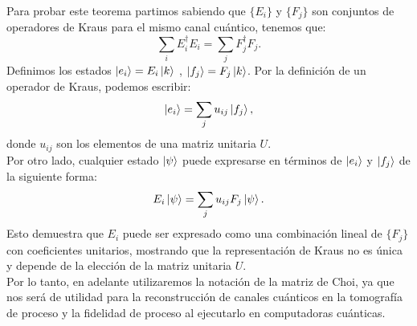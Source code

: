 \documentclass[letterpaper,12pt]{thesisECFM}
\theoremstyle{plain}
\theoremstyle{definition}
\theoremstyle{definition}
\theoremstyle{remark}
\newcommand{\1}{\mathbb{1}}
\begin{document}
Para probar este teorema partimos sabiendo que  $\{E_i\}$ y $\{F_j\}$ son conjuntos de operadores de Kraus para el mismo canal cuántico, tenemos que:
\begin{equation}
   \sum_i E_i^\dagger E_i = \sum_j F_j^\dagger F_j. 
\end{equation}
Definimos los estados $\ket{e_i} = E_i \ket{k}$ , $\ket{f_j} = F_j \ket{k}$. Por la definición de un operador de Kraus, podemos escribir:
\begin{equation}
  \ket{e_i} = \sum_j u_{ij} \ket{f_j},  
\end{equation} 
donde $u_{ij}$ son los elementos de una matriz unitaria $U$.\\
Por otro lado, cualquier estado $\ket{\psi}$ puede expresarse en términos de $\ket{e_i}$ y $\ket{f_j}$ de la siguiente forma:
\begin{equation}
E_i \ket{\psi} = \sum_j u_{ij} F_j \ket{\psi}.
\end{equation}
Esto demuestra que $E_i$ puede ser expresado como una combinación lineal de $\{F_j\}$ con coeficientes unitarios, mostrando que la representación de Kraus no es única y depende de la elección de la matriz unitaria $U$.\\
Por lo tanto, en adelante utilizaremos la notación de la matriz de Choi, ya que nos será de utilidad para la reconstrucción de canales cuánticos en la tomografía de proceso y la fidelidad de proceso al ejecutarlo en computadoras cuánticas.
\end{document}
